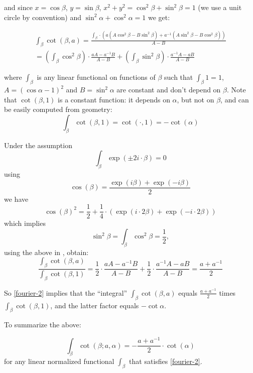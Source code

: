 \noindent and since $x=\cos{\beta}$, $y=\sin{\beta}$, 
$x^2 + y^2 = \cos^2{\beta} + \sin^2{\beta} = 1$ (we use a unit circle by convention)
and $\sin^2 \alpha + \cos^2 \alpha = 1$ we get:

\begin{multline}
\label{eqn:3}
\int_\beta \cot(\beta,a)
= \frac{\int_\beta \cdot ( a (A \cos^2 \beta - B \sin^2 \beta) + a^{-1} (A \sin^2 \beta - B \cos^2 \beta))}{A-B} 
\\
= \left(\int_\beta \cos^2 \beta \right) \cdot \frac{a A-a^{-1}B}{A-B}
+ \left(\int_\beta \sin^2 \beta \right) \cdot \frac{a^{-1}A-a B}{A-B}
\end{multline}

\noindent where $\int_\beta$ is any linear functional on functions of $\beta$ such that $\int_\beta 1 = 1$,
$A = (\cos \alpha - 1)^2$ and $B = \sin^2 \alpha$ are constant and don't depend on $\beta$.
Note that $\cot(\beta,1)$ is a constant function:
it depends on $\alpha$, but not on $\beta$,
and can be easily computed from geometry:
\[ \int_\beta \cot(\beta,1) = \cot(\cdot,1) = -\cot(\alpha) \]

Under the assumption
\begin{equation}
 \label{fourier-2}
 \int_\beta  \exp(\pm2i\cdot\beta) = 0
\end{equation}
using
\[\cos(\beta) = \frac{\exp(i\beta) + \exp(-i\beta)}2 \]
we have
\[ \cos(\beta)^2 = \frac12 + \frac14\cdot{(\exp(i\cdot2\beta) + \exp(-i\cdot2\beta))} \]
which implies
\[
\sin^2 \beta = \int_\beta \cos^2 \beta = \frac12,
\]
using the above in , obtain:
\begin{equation*}
\frac{\int_\beta \cot(\beta,a)}{\int_\beta \cot(\beta,1)}
= \frac12 \cdot \frac{aA-a^{-1}B}{A-B}
+ \frac12 \cdot \frac{a^{-1}A-a B}{A-B}
= \frac{a+a^{-1}}2
\end{equation*}

So \cref{fourier-2} implies that the ``integral'' $\int_\beta \cot(\beta,a)$
equals $\frac{a+a^{-1}}{2}$ times  $\int_\beta \cot(\beta,1)$, and the latter factor equals $-\cot \alpha$.

To summarize the above:

\begin{equation} \label{space-average}
\int_\beta  \cot(\beta;a,\alpha)  = - \frac{a+a^{-1}}{2} \cdot \cot(\alpha)
\end{equation}
for any linear normalized functional $\int_\beta$ that satisfies \cref{fourier-2}.

